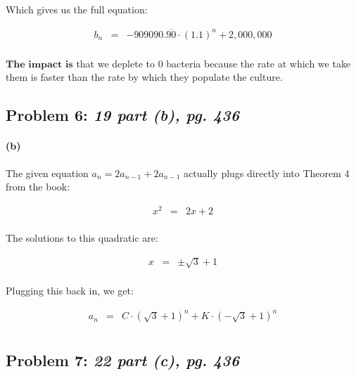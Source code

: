 \documentclass[a4paper]{article}
\begin{document}
Which gives us the full equation:

\begin{equation}
\begin{array}{rcl}
b_n & = & -909090.\overline{90} \cdot (1.1)^n + 2,000,000 \\[.08in]
\end{array}
\end{equation}

$\textbf{The impact is}$ that we deplete to 0 bacteria because the rate at which we take them is faster than the rate by which they populate the culture.

\subsection*{Problem 6: \textit{19 part (b), pg. 436}}

\paragraph{(b)} The given equation $a_n = 2a_{n-1} + 2a_{n-1}$ actually plugs directly into Theorem 4 from the book:

\begin{equation*}
\begin{array}{rcl}
x^2 & = & 2x + 2 \\[.08in]
\end{array}
\end{equation*}

The solutions to this quadratic are:

\begin{equation*}
\begin{array}{rcl}
x & = & \pm \sqrt{3} + 1 \\[.08in]
\end{array}
\end{equation*}

Plugging this back in, we get:

\begin{equation}
\begin{array}{rcl}
a_n & = & C \cdot (\sqrt{3} + 1)^n + K \cdot (-\sqrt{3} + 1)^n \\[.08in]
\end{array}
\end{equation}

\subsection*{Problem 7: \textit{22 part (c), pg. 436}}
\end{document}

